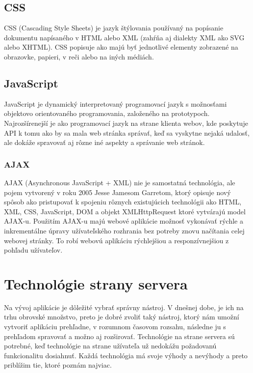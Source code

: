 \subsection*{CSS}

CSS (Cascading Style Sheets) je jazyk štýlovania používaný na popísanie dokumentu napísaného v HTML alebo XML (zahŕňa aj dialekty XML ako SVG alebo XHTML). CSS popisuje ako majú byť jednotlivé elementy zobrazené na obrazovke, papieri, v reči alebo na iných médiách. \citep{web:css}

\subsection*{JavaScript}

JavaScript je dynamický interpretovaný programovací jazyk s možnosťami objektovo orientovaného programovania, založeného na prototypoch. Najrozšírenejší je ako programovací jazyk na strane klienta webov, kde poskytuje API k tomu ako by sa mala web stránka správať, keď sa vyskytne nejaká udalosť, ale dokáže spravovať aj rôzne iné aspekty a správanie web stránok. \citep{web:javascript}

\subsubsection*{AJAX}

AJAX (Asynchronous JavaScript + XML) nie je samostatná technológia, ale pojem vytvorený v roku 2005 Jesse Jamesom Garretom, ktorý opisuje nový spôsob ako pristupovať k spojeniu rôznych existujúcich technológii ako HTML, XML, CSS, JavaScript, DOM a objekt XMLHttpRequest ktoré vytvárajú model AJAX-u. Použitím AJAX-u majú webové aplikácie možnosť vykonávať rýchle a inkrementálne úpravy užívateľského rozhrania bez potreby znovu načítania celej webovej stránky. To robí webovú aplikáciu rýchlejšiou a responzívnejšiou z pohľadu užívateľov. \citep{web:ajax}

\section{Technológie strany servera}

Na vývoj aplikácie je dôležité vybrať správny nástroj. V dnešnej dobe, je ich na trhu obrovské množstvo, preto je dobré zvoliť taký nástroj, ktorý nám umožní vytvoriť aplikáciu prehľadne, v rozumnom časovom rozsahu, následne ju s prehľadom spravovať a možno aj rozširovať. Technológie na strane servera sú potrebné, keď technológie na strane užívateľa už nedokážu požadovanú funkcionalitu dosiahnuť. Každá technológia má svoje výhody a nevýhody a preto priblížim tie, ktoré poznám najviac.

